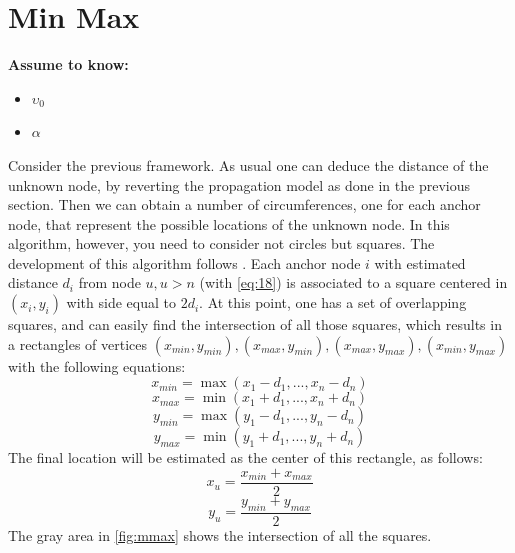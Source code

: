 \documentclass[12pt]{report}
\begin{document}
\section{Min Max}
  \begin{center}
  \textbf{Assume to know:}
  \begin{itemize}
    \centering
    \item $\upsilon_0$
    \item $\alpha$
  \end{itemize}
  \end{center}
Consider the previous framework. As usual one can deduce the distance of the unknown node, by reverting the propagation model as done in the previous section. Then we can obtain a number of circumferences, one for each anchor node, that represent the possible locations of the unknown node. In this algorithm, however, you need to consider not circles but squares. The development of this algorithm follows \cite{inproceedings}. Each anchor node $i$ with estimated distance $d_i$ from node $u,u>n$ (with \ref{eq:18}) is associated to a square centered in $(x_i,y_i)$ with side equal to $2d_i$. At this point, one has a set of overlapping squares, and can easily find the intersection of all those squares,  which results in a rectangles of vertices $(x_{min},y_{min}), (x_{max},y_{min}), (x_{max},y_{max}), (x_{min},y_{max})$ with the following equations:
\begin{equation}
    x_{min}=\max(x_1-d_1,...,x_n-d_n)
\end{equation}
\begin{equation}
    x_{max}=\min(x_1+d_1,...,x_n+d_n)
\end{equation}
\begin{equation}
    y_{min}=\max(y_1-d_1,...,y_n-d_n)
\end{equation}
\begin{equation}
    y_{max}=\min(y_1+d_1,...,y_n+d_n)
\end{equation}
The final location will be estimated as the center of this rectangle, as follows:
\begin{equation}
    x_u=\frac{x_{min}+x_{max}}{2}
\end{equation}
\begin{equation}
    y_u=\frac{y_{min}+y_{max}}{2}
\end{equation}
The gray area in \ref{fig:mmax} shows the intersection of all the squares.
\end{document}
